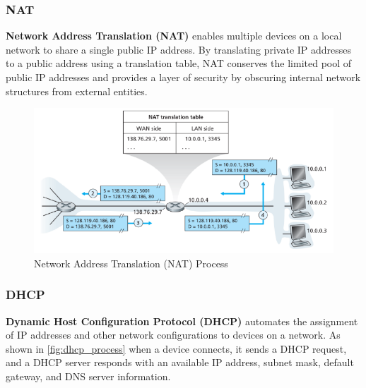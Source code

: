 \subsubsection{NAT}
\label{nat}

\textbf{Network Address Translation (NAT)} enables multiple devices on a local network to share a single public IP address. By translating private IP addresses to a public address using a translation table, NAT conserves the limited pool of public IP addresses and provides a layer of security by obscuring internal network structures from external entities.

\begin{figure}[H]
    \centering
    \includegraphics[scale=0.4]{assets/nat.png}
    \caption{Network Address Translation (NAT) Process}
    \label{fig:nat_process}
\end{figure}


\subsubsection{DHCP}
\label{dhcp}

\textbf{Dynamic Host Configuration Protocol (DHCP)} automates the assignment of IP addresses and other network configurations to devices on a network. As shown in \cref{fig:dhcp_process} when a device connects, it sends a DHCP request, and a DHCP server responds with an available IP address, subnet mask, default gateway, and DNS server information.

